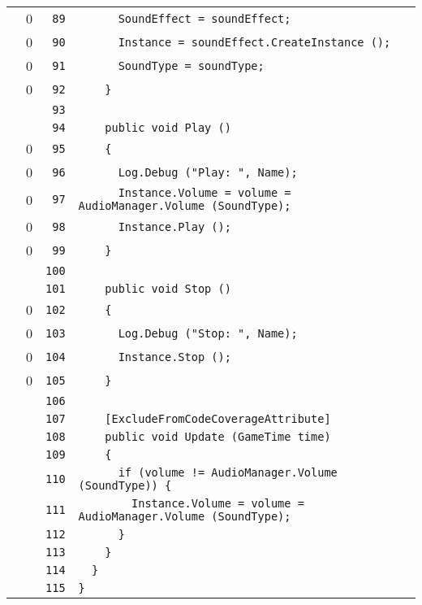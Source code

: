\documentclass[a4paper,10pt]{article}
\begin{document}
\begin{longtable}[l]{lrrl}
\cellcolor{red} & 0 & \verb~89~ & \verb~      SoundEffect = soundEffect;~\\
\cellcolor{red} & 0 & \verb~90~ & \verb~      Instance = soundEffect.CreateInstance ();~\\
\cellcolor{red} & 0 & \verb~91~ & \verb~      SoundType = soundType;~\\
\cellcolor{red} & 0 & \verb~92~ & \verb~    }~\\
\cellcolor{gray} &  & \verb~93~ & \verb~~\\
\cellcolor{gray} &  & \verb~94~ & \verb~    public void Play ()~\\
\cellcolor{red} & 0 & \verb~95~ & \verb~    {~\\
\cellcolor{red} & 0 & \verb~96~ & \verb~      Log.Debug ("Play: ", Name);~\\
\cellcolor{red} & 0 & \verb~97~ & \verb~      Instance.Volume = volume = AudioManager.Volume (SoundType);~\\
\cellcolor{red} & 0 & \verb~98~ & \verb~      Instance.Play ();~\\
\cellcolor{red} & 0 & \verb~99~ & \verb~    }~\\
\cellcolor{gray} &  & \verb~100~ & \verb~~\\
\cellcolor{gray} &  & \verb~101~ & \verb~    public void Stop ()~\\
\cellcolor{red} & 0 & \verb~102~ & \verb~    {~\\
\cellcolor{red} & 0 & \verb~103~ & \verb~      Log.Debug ("Stop: ", Name);~\\
\cellcolor{red} & 0 & \verb~104~ & \verb~      Instance.Stop ();~\\
\cellcolor{red} & 0 & \verb~105~ & \verb~    }~\\
\cellcolor{gray} &  & \verb~106~ & \verb~~\\
\cellcolor{gray} &  & \verb~107~ & \verb~    [ExcludeFromCodeCoverageAttribute]~\\
\cellcolor{gray} &  & \verb~108~ & \verb~    public void Update (GameTime time)~\\
\cellcolor{gray} &  & \verb~109~ & \verb~    {~\\
\cellcolor{gray} &  & \verb~110~ & \verb~      if (volume != AudioManager.Volume (SoundType)) {~\\
\cellcolor{gray} &  & \verb~111~ & \verb~        Instance.Volume = volume = AudioManager.Volume (SoundType);~\\
\cellcolor{gray} &  & \verb~112~ & \verb~      }~\\
\cellcolor{gray} &  & \verb~113~ & \verb~    }~\\
\cellcolor{gray} &  & \verb~114~ & \verb~  }~\\
\cellcolor{gray} &  & \verb~115~ & \verb~}~\\
\end{longtable}
\newpage
\end{document}
